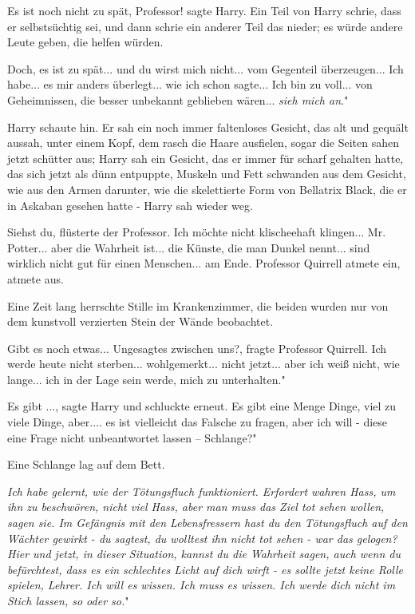 \glqq{}Es ist noch nicht zu spät, Professor!\grqq{} sagte Harry. Ein Teil von
Harry schrie, dass er selbstsüchtig sei, und dann schrie ein anderer Teil das
nieder; es würde andere Leute geben, die helfen würden.

\glqq{}Doch, es ist zu spät... und du wirst mich nicht... vom Gegenteil
überzeugen... Ich habe... es mir anders überlegt... wie ich schon sagte... Ich
bin zu voll... von Geheimnissen, die besser unbekannt geblieben wären...
\emph{sieh mich an}."

Harry schaute hin. Er sah ein noch immer faltenloses Gesicht, das alt und
gequält aussah, unter einem Kopf, dem rasch die Haare ausfielen, sogar die
Seiten sahen jetzt schütter aus; Harry sah ein Gesicht, das er immer für scharf
gehalten hatte, das sich jetzt als dünn entpuppte, Muskeln und Fett schwanden
aus dem Gesicht, wie aus den Armen darunter, wie die skelettierte Form von
Bellatrix Black, die er in Askaban gesehen hatte - Harry sah wieder weg.

\glqq{}Siehst du\grqq{}, flüsterte der Professor. \glqq{}Ich möchte nicht
klischeehaft klingen... Mr. Potter... aber die Wahrheit ist... die Künste, die
man Dunkel nennt... sind wirklich nicht gut für einen Menschen... am
Ende.\grqq{} Professor Quirrell atmete ein, atmete aus.

Eine Zeit lang herrschte Stille im Krankenzimmer, die beiden wurden nur von dem
kunstvoll verzierten Stein der Wände beobachtet.

\glqq{}Gibt es noch etwas... Ungesagtes zwischen uns?\grqq{}, fragte Professor
Quirrell. \glqq{}Ich werde heute nicht sterben... wohlgemerkt... nicht jetzt...
aber ich weiß nicht, wie lange... ich in der Lage sein werde, mich zu
unterhalten."

\glqq{}Es gibt ...\grqq{}, sagte Harry und schluckte erneut. \glqq{}Es gibt eine
Menge Dinge, viel zu viele Dinge, aber.... es ist vielleicht das Falsche zu
fragen, aber ich will - diese eine Frage nicht unbeantwortet lassen – Schlange?"

Eine Schlange lag auf dem Bett.

\glqq{}\emph{Ich habe gelernt, wie der Tötungsfluch funktioniert. Erfordert
wahren Hass, um ihn zu beschwören, nicht viel Hass, aber man muss das Ziel tot
sehen wollen, sagen sie. Im Gefängnis mit den Lebensfressern hast du den
Tötungsfluch auf den Wächter gewirkt - du sagtest, du wolltest ihn nicht tot
sehen - war das gelogen? Hier und jetzt, in dieser Situation, kannst du die
Wahrheit sagen, auch wenn du befürchtest, dass es ein schlechtes Licht auf dich
wirft - es sollte jetzt keine Rolle spielen, Lehrer. Ich will es wissen. Ich
muss es wissen. Ich werde dich nicht im Stich lassen, so oder so.}"

